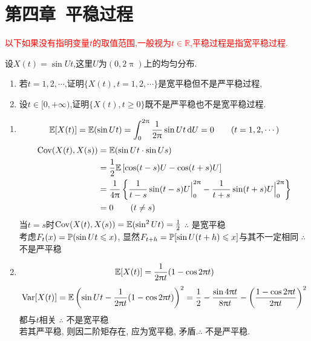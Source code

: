 \section{第四章~平稳过程}
\noindent\textcolor{red}{以下如果没有指明变量$t$的取值范围,一般视为$t\in \mathbb{R}$,平稳过程是指宽平稳过程.}

\begin{problem}{4.1}
设$X(t)=\sin Ut$,这里$U$为$(0,2\uppi)$上的均匀分布.
\begin{enumerate}[label=(\alph*)]
	\item 若$t=1,2,\cdots$,证明$\{X(t),t=1,2,\cdots \}$是宽平稳但不是严平稳过程,
	\item 设$t\in [0,+\infty )$,证明$\{X(t),t\geqslant 0\}$既不是严平稳也不是宽平稳过程.
\end{enumerate}
\end{problem}
\begin{solution}
	\begin{enumerate}[label=(\alph*)]
		\item \[\mathbb{E}[X(t)] = \mathbb{E}(\sin Ut) = \int^{2\uppi}_0 \frac{1}{2\uppi}\sin Ut \mathop{}\!\mathrm{d} U = 0 \qquad (t = 1,2,\cdots)\]
		      \[
			      \begin{split}
				      \mathrm{Cov}(X(t), X(s)) & = \mathbb{E}(\sin Ut \cdot \sin Us)\\
				      & = \frac{1}{2}\mathbb{E}\left[\cos(t-s)U-\cos(t+s)U\right]\\
				      & = \frac{1}{4\uppi}\left\{\frac{1}{t-s}\sin(t-s)U \Big|^{2\uppi}_0 - \frac{1}{t+s}\sin(t+s)U \Big|^{2\uppi}_0\right\}\\
				      & = 0 \qquad (t\neq s)
			      \end{split}
		      \]
		      当$t=s$时$\mathrm{Cov}(X(t), X(s)) = \mathbb{E}(\sin^2 Ut) = \frac{1}{2}$ \quad $\therefore$ 是宽平稳\\
		      考虑$F_t(x) = \mathbb{P}(\sin Ut \leqslant x)$, 显然$F_{t+h} = \mathbb{P}[\sin U(t+h) \leqslant x]$与其不一定相同 \quad $\therefore$ 不是严平稳
		\item \[\mathbb{E}[X(t)] = \frac{1}{2\uppi t}(1-\cos 2\uppi t)\]
		      \[\mathrm{Var}[X(t)] = \mathbb{E}\left(\sin Ut - \frac{1}{2\uppi t}(1-\cos 2\uppi t)\right)^2 = \frac{1}{2} - \frac{\sin 4\uppi t}{8\uppi t} - \left(\frac{1-\cos 2\uppi t}{2\uppi t}\right)^2\]
		      都与$t$相关 \quad $\therefore$ 不是宽平稳\\
		      若其严平稳, 则因二阶矩存在, 应为宽平稳, 矛盾.\quad $\therefore$ 不是严平稳.\\
	\end{enumerate}
\end{solution}


